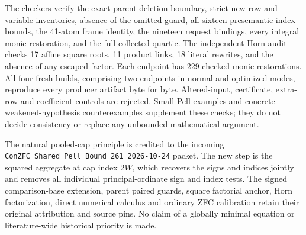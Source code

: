 The checkers verify the exact parent deletion boundary, strict new
row and variable inventories, absence of the omitted guard, all
sixteen presemantic index bounds, the 41-atom frame identity,
the nineteen request bindings, every integral monic restoration,
and the full collected quartic. The independent Horn audit checks
17 affine square roots, 11 product links, 18 literal rewrites,
and the absence of any escaped factor. Each endpoint has 229
checked monic restorations. All four fresh builds, comprising
two endpoints in normal and optimized modes, reproduce every
producer artifact byte for byte. Altered-input, certificate,
extra-row and coefficient controls are rejected. Small Pell
examples and concrete weakened-hypothesis counterexamples
supplement these checks; they do not decide consistency or
replace any unbounded mathematical argument.

The natural pooled-cap principle is credited to the incoming
\texttt{ConZFC\_Shared\_Pell\_Bound\_261\_2026-10-24} packet.
The new step is the squared aggregate at cap index $2W$, which
recovers the signs and indices jointly and removes all individual
principal-ordinate sign and index tests. The signed comparison-base
extension, parent paired guards, square factorial anchor,
Horn factorization, direct numerical calculus and ordinary ZFC
calibration retain their original attribution and source pins.
No claim of a globally minimal equation or literature-wide
historical priority is made.

